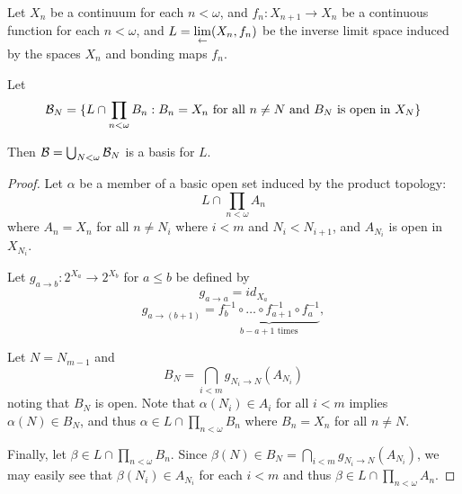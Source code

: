 



Let $X_n$ be a continuum for each $n<\omega$, and $f_n:X_{n+1}\to X_n$ be a continuous function for each $n<\omega$, and $\displaystyle L=\lim_{\leftarrow}(X_n,f_n)$ be the inverse limit space induced by the spaces $X_n$ and bonding maps $f_n$.

\begin{lemma}\label{basis}
  Let 
    \[
      \mathcal{B}_N = 
      \{L\cap \prod_{n<\omega} B_n : B_n=X_n \text{ for all } n\not= N \text{ and } B_N \text{ is open in } X_N\}
    \]

  Then $\mathcal{B} = \bigcup_{N<\omega} \mathcal{B}_N$ is a basis for $L$.
\end{lemma}

\begin{proof}
  Let $\alpha$ be a member of a basic open set induced by the product topology:
    \[
      L \cap \prod_{n<\omega} A_n
    \]
  where $A_n=X_n$ for all $n\not=N_i$ where $i<m$ and $N_i<N_{i+1}$, and $A_{N_i}$ is open in $X_{N_i}$.

  Let $g_{a\to b}: 2^{X_a}\to 2^{X_b}$ for $a\leq b$ be defined by
  \[
    g_{a\to a} = id_{X_a}
  \]
  \[
    g_{a\to (b+1)} =
    \underbrace{ f^{-1}_{b} \circ \dots \circ f^{-1}_{a+1} \circ f^{-1}_a}_{b-a+1 \text{ times}},
  \]

  Let $N=N_{m-1}$ and
    \[
      B_N = \bigcap_{i<m} g_{N_i\to N} (A_{N_i})
    \]
  noting that $B_N$ is open. Note that $\alpha(N_i)\in A_i$ for all $i<m$ implies $\alpha(N)\in B_N$, and thus $\alpha\in L \cap \prod_{n<\omega} B_n$ where $B_n=X_n$ for all $n\not=N$.

  Finally, let $\beta\in L \cap \prod_{n<\omega} B_n$. Since $\beta(N)\in B_N = \bigcap_{i<m} g_{N_i\to N} (A_{N_i})$, we may easily see that $\beta(N_i)\in A_{N_i}$ for each $i<m$ and thus $\beta\in L\cap\prod_{n<\omega} A_n$.
\end{proof}


